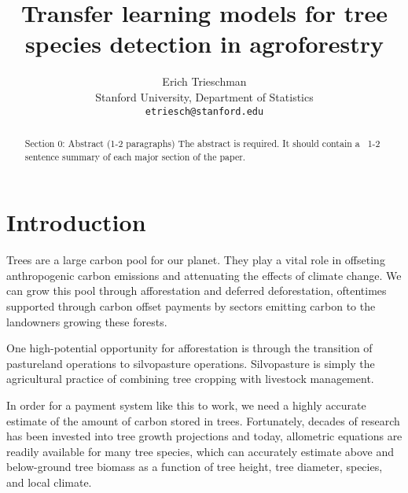 \documentclass[10pt,twocolumn,letterpaper]{article}
\begin{document}
\title{Transfer learning models for tree species detection in agroforestry}

\author{Erich Trieschman\\
Stanford University, Department of Statistics\\
{\tt\small etriesch@stanford.edu}
}
\maketitle

\begin{abstract}
  Section 0: Abstract (1-2 paragraphs)
  The abstract is required. It should contain a ~1-2 sentence summary of each major section of the paper.
\end{abstract}

\section{Introduction}
\label{sec:intro}
Trees are a large carbon pool for our planet. They play a vital role in offseting anthropogenic carbon emissions and attenuating the effects of climate change. We can grow this pool through afforestation and deferred deforestation, oftentimes supported through carbon offset payments by sectors emitting carbon to the landowners growing these forests. 

One high-potential opportunity for afforestation is through the transition of pastureland operations to silvopasture operations. Silvopasture is simply the agricultural practice of combining tree cropping with livestock management. 

In order for a payment system like this to work, we need a highly accurate estimate of the amount of carbon stored in trees. Fortunately, decades of research has been invested into tree growth projections and today, allometric equations are readily available for many tree species, which can accurately estimate above and below-ground tree biomass as a function of tree height, tree diameter, species, and local climate. 
\end{document}
